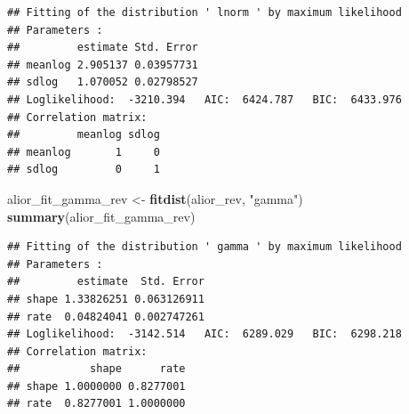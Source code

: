 \documentclass[
]{article}
\newenvironment{Shaded}{\begin{snugshade}}{\end{snugshade}}
\newcommand{\AttributeTok}[1]{\textcolor[rgb]{0.13,0.29,0.53}{#1}}
\newcommand{\ControlFlowTok}[1]{\textcolor[rgb]{0.13,0.29,0.53}{\textbf{#1}}}
\newcommand{\FloatTok}[1]{\textcolor[rgb]{0.00,0.00,0.81}{#1}}
\newcommand{\FunctionTok}[1]{\textcolor[rgb]{0.13,0.29,0.53}{\textbf{#1}}}
\newcommand{\NormalTok}[1]{#1}
\newcommand{\OtherTok}[1]{\textcolor[rgb]{0.56,0.35,0.01}{#1}}
\newcommand{\SpecialCharTok}[1]{\textcolor[rgb]{0.81,0.36,0.00}{\textbf{#1}}}
\newcommand{\StringTok}[1]{\textcolor[rgb]{0.31,0.60,0.02}{#1}}
\begin{document}
\begin{verbatim}
## Fitting of the distribution ' lnorm ' by maximum likelihood 
## Parameters : 
##         estimate Std. Error
## meanlog 2.905137 0.03957731
## sdlog   1.070052 0.02798527
## Loglikelihood:  -3210.394   AIC:  6424.787   BIC:  6433.976 
## Correlation matrix:
##         meanlog sdlog
## meanlog       1     0
## sdlog         0     1
\end{verbatim}

\begin{Shaded}
\end{Shaded}

\begin{Shaded}
\begin{Highlighting}[]
\NormalTok{alior\_fit\_gamma\_rev }\OtherTok{\textless{}{-}} \FunctionTok{fitdist}\NormalTok{(alior\_rev, }\StringTok{"gamma"}\NormalTok{)}
\FunctionTok{summary}\NormalTok{(alior\_fit\_gamma\_rev)}
\end{Highlighting}
\end{Shaded}

\begin{verbatim}
## Fitting of the distribution ' gamma ' by maximum likelihood 
## Parameters : 
##         estimate  Std. Error
## shape 1.33826251 0.063126911
## rate  0.04824041 0.002747261
## Loglikelihood:  -3142.514   AIC:  6289.029   BIC:  6298.218 
## Correlation matrix:
##           shape      rate
## shape 1.0000000 0.8277001
## rate  0.8277001 1.0000000
\end{verbatim}

\begin{Shaded}
\end{Shaded}
\end{document}
